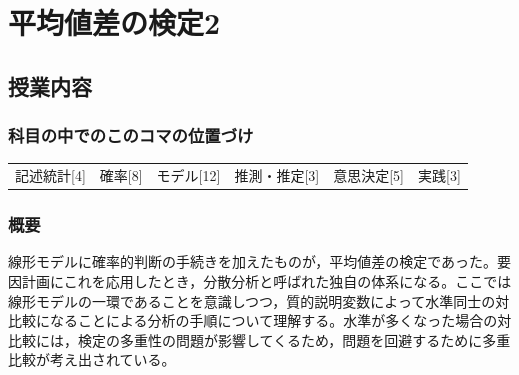 \section{平均値差の検定2}
\label{lesson21}

\subsection{授業内容}
\subsubsection{科目の中でのこのコマの位置づけ}
\begin{tabular}[t]{cccccc}
    記述統計[4] & 確率[8] & モデル[12] & 推測・推定[3] & 意思決定[5] & 実践[3]
\end{tabular}

\subsubsection{概要}
線形モデルに確率的判断の手続きを加えたものが，平均値差の検定であった。要因計画にこれを応用したとき，分散分析と呼ばれた独自の体系になる。ここでは線形モデルの一環であることを意識しつつ，質的説明変数によって水準同士の対比較になることによる分析の手順について理解する。水準が多くなった場合の対比較には，検定の多重性の問題が影響してくるため，問題を回避するために多重比較が考え出されている。

